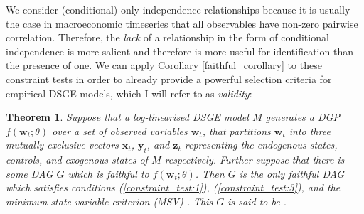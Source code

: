 \documentclass{article}
\newtheorem{theorem}{Theorem}
\begin{document}
We consider (conditional) only independence relationships because it is usually the case in macroeconomic timeseries that all observables have non-zero pairwise correlation. Therefore, the \textit{lack} of a relationship in the form of conditional independence is more salient and therefore is more useful for identification than the presence of one. We can apply Corollary \ref{faithful_corollary} to these constraint tests in order to already provide a powerful selection criteria for empirical DSGE models, which I will refer to as \textit{validity}:

\theoremstyle{theorem}
\begin{theorem}
  Suppose that a log-linearised DSGE model $M$ generates a DGP $f(\mathbf{w}_t;\theta)$ over a set of observed variables $\mathbf{w}_t$, that partitions $\mathbf{w}_t$ into three mutually exclusive vectors $\mathbf{x}_t$, $\mathbf{y}_t$, and $\mathbf{z}_t$ representing the endogenous states, controls, and exogenous states of $M$ respectively. Further suppose that there is some DAG $G$ which is \textit{faithful} to $f(\mathbf{w}_t;\theta)$. Then $G$ is the only faithful DAG which satisfies conditions (\ref{constraint_test:1}), (\ref{constraint_test:3}), and the minimum state variable criterion (MSV) \parencite{mccallum1999role}. This $G$ is said to be .
  \label{validity}
\end{theorem}
\end{document}
